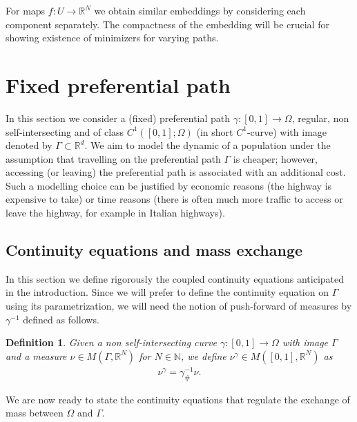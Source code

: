 \documentclass{article}
\def\R{{\mathbb R}}
\newtheorem{definition}[theorem]{Definition}
\begin{document}
For maps $f:U\to\R^N$ we obtain similar embeddings by considering each component separately.
The compactness of the embedding will be crucial for showing existence of minimizers for varying paths.


\section{Fixed preferential path}\label{sec:FixedPath}

In this section we consider a (fixed) preferential path $\gamma : [0,1] \rightarrow \Omega$, regular, non self-intersecting and of class $C^1([0,1];\Omega)$ (in short $C^1$-curve) with image denoted by $\Gamma \subset \R^d$.
We aim to model the dynamic of a population under the assumption that travelling on the preferential path $\Gamma$ is cheaper; however, accessing (or leaving) the preferential path is associated with an additional cost. Such a modelling choice can be justified by economic reasons (the highway is expensive to take) or time reasons (there is often much more traffic to access or leave the highway, for example in Italian highways). 



\subsection{Continuity equations and mass exchange}\label{sec:conn}


In this section we define rigorously the coupled continuity equations anticipated in the introduction. Since we will prefer to define the continuity equation on $\Gamma$ using its parametrization, we will need the notion of push-forward of measures by $\gamma^{-1}$ defined as follows.



\begin{definition}\label{def:push}
Given a non self-intersecting curve $\gamma : [0,1] \rightarrow \Omega$ with image $\Gamma$ and a measure $\nu \in M(\Gamma, \mathbb{R}^N)$ for $N \in \mathbb{N}$, we define $\nu^\gamma \in M([0,1], \mathbb{R}^N)$ as 
\begin{align*}
    \nu^\gamma =  \gamma^{-1}_{\#} \nu.
\end{align*}
\end{definition}
We are now ready to state the continuity equations that regulate the exchange of mass between $\Omega$ and $\Gamma$.  
\end{document}
